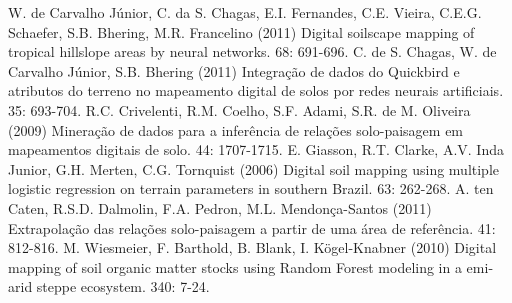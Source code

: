 \begin{footnotesize}
\begin{thebibliography}{99}
W. de Carvalho Júnior, C. da S. Chagas, E.I. Fernandes, C.E. Vieira, C.E.G. Schaefer, S.B. Bhering, M.R. Francelino (2011)
\newblock Digital soilscape mapping of tropical hillslope areas by neural networks.
 68: 691-696.
C. de S. Chagas, W. de Carvalho Júnior, S.B. Bhering (2011)
\newblock Integração de dados do Quickbird e atributos do terreno no mapeamento digital de solos por redes neurais artificiais.
 35: 693-704.
R.C. Crivelenti, R.M. Coelho, S.F. Adami, S.R. de M. Oliveira (2009)
\newblock Mineração de dados para a inferência de relações solo-paisagem em mapeamentos digitais de solo.
 44: 1707-1715.
E. Giasson, R.T. Clarke, A.V. Inda Junior, G.H. Merten, C.G. Tornquist (2006)
\newblock Digital soil mapping using multiple logistic regression on terrain parameters in southern Brazil.
 63: 262-268.
A. ten Caten, R.S.D. Dalmolin, F.A. Pedron, M.L. Mendonça-Santos (2011)
\newblock Extrapolação das relações solo-paisagem a partir de uma área de referência.
 41: 812-816.
M. Wiesmeier, F. Barthold, B. Blank,  I. Kögel-Knabner (2010)
\newblock Digital mapping of soil organic matter stocks using Random Forest modeling in a emi-arid steppe ecosystem.
 340: 7-24.
\end{thebibliography}
\end{footnotesize}
\address{Helena Saraiva Koenow Pinheiro\\
  Universidade Federal Rural do Rio de Janeiro\\
  }